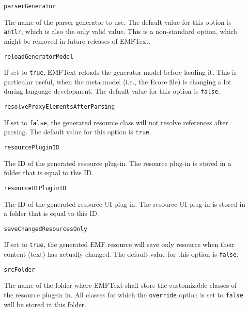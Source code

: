 \noindent\texttt{parserGenerator}
\begin{myindentpar}{1cm}
The name of the parser generator to use. The default value for this option is \texttt{antlr}, which is also the only valid value. This is a non-standard option, which might be removed in future releases of EMFText.
\end{myindentpar}

\noindent\texttt{reloadGeneratorModel}
\begin{myindentpar}{1cm}
If set to \texttt{true}, EMFText reloads the generator model before loading it. This is particular useful, when the meta model (i.e., the Ecore file) is changing a lot during language development. The default value for this option is \texttt{false}.
\end{myindentpar}

\noindent\texttt{resolveProxyElementsAfterParsing}
\begin{myindentpar}{1cm}
If set to \texttt{false}, the generated resource class will not resolve references after parsing. The default value for this option is \texttt{true}.
\end{myindentpar}

\noindent\texttt{resourcePluginID}
\begin{myindentpar}{1cm}
The ID of the generated resource plug-in. The resource plug-in is stored in a folder that is equal to this ID.
\end{myindentpar}

\noindent\texttt{resourceUIPluginID}
\begin{myindentpar}{1cm}
The ID of the generated resource UI plug-in. The resource UI plug-in is stored in a folder that is equal to this ID.
\end{myindentpar}

\noindent\texttt{saveChangedResourcesOnly}
\begin{myindentpar}{1cm}
If set to \texttt{true}, the generated EMF resource will save only resource when their content (text) has actually changed. The default value for this option is \texttt{false}.
\end{myindentpar}

\noindent\texttt{srcFolder}
\begin{myindentpar}{1cm}
The name of the folder where EMFText shall store the customizable classes of the resource plug-in in. All classes for which the \texttt{override} option is set to \texttt{false} will be stored in this folder.
\end{myindentpar}

